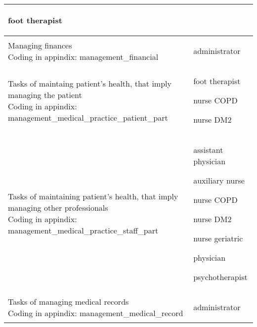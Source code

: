 \documentclass[12pt,a4paper,oneside]{article}
\begin{document}
\begin{table}
\begin{tabularx}{\textwidth}{|X|X|}
{\begin{itemize}
{ \item foot therapist}
\vspace{-.5em}\end{itemize}}\\
\hline
Managing finances
{\newline\tiny Coding in appindix: {management\_financial}}&{\begin{itemize}
\vspace{-1.5em}\setlength\itemsep{0em}
{ \item administrator}
\vspace{-.5em}\end{itemize}}\\
\hline
Tasks of maintaing patient's health, that imply managing the patient
{\newline\tiny Coding in appindix:\newline {management\_medical\_practice\_patient\_part}}&{\begin{itemize}
\vspace{-1.5em}\setlength\itemsep{0em}
{ \item foot therapist}
{ \item nurse COPD}
{ \item nurse DM2}
\vspace{-.5em}\end{itemize}}\\
\hline
Tasks of maintaining patient's health, that imply managing other professionals
{\newline\tiny Coding in appindix: {management\_medical\_practice\_staff\_part}}&{\begin{itemize}
\vspace{-1.5em}\setlength\itemsep{0em}
{ \item assistant physician}
{ \item auxiliary nurse }
{ \item nurse COPD}
{ \item nurse DM2}
{ \item nurse geriatric}
{ \item physician}
{ \item psychotherapist}
\vspace{-.5em}\end{itemize}}\\
\hline
Tasks of managing medical records
{\newline\tiny Coding in appindix: {management\_medical\_record}}&{\begin{itemize}
\vspace{-1.5em}\setlength\itemsep{0em}
{ \item administrator}
\vspace{-.5em}\end{itemize}}\\
\hline
\end{tabularx}
\end{table}
\end{document}

